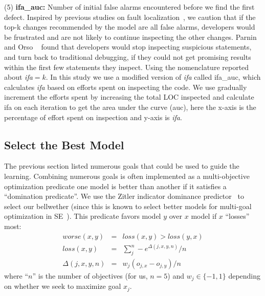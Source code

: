 \documentclass[10pt,journal,compsoc]{IEEEtran}
\begin{document}
{(5) \textbf{ifa\_auc:} Number of  initial false alarms encountered before we find the first defect. Inspired by previous studies on fault localization~\cite{parnin2011automated, kochhar2016practitioners, xia2016automated}, we caution that if the top-k changes recommended by the model are all false alarms, developers would be frustrated and are not likely to continue inspecting the other changes. Parnin and Orso ~\cite{parnin2011automated} found that developers would stop inspecting suspicious statements, and turn back to traditional debugging, if they could not get promising results within the first few statements they inspect. Using the nomenclature reported about {\em ifa$=k$}.  In this study we use a modified version of {\em ifa} called ifa\_auc, which calculates {\em ifa} based on efforts spent on inspecting the code. We use gradually increment the efforts spent by increasing the total LOC inspected and calculate ifa on each iteration to get the area under the curve (auc), here the x-axis is the percentage of effort spent on inspection and y-axis is {\em ifa}.}


\subsection{Select the Best Model}\label{sec:best}

The previous section listed numerous goals that could be used to guide the learning. Combining
numerous goals is often implemented as a multi-objective optimization predicate  one model is better than another if it
 satisfies a ``domination predicate''.
 We use the Zitler indicator dominance
 predictor~\cite{zit02} to select our bellwether (since this is known to select better models
 for multi-goal optimization in SE~\cite{Sayyad:2013,Sayyad:2013:SPL}).
This predicate favors model
  $y$ over $x$  model if $x$ ``losses'' most:
\begin{equation}\label{eq:cdom}
\begin{array}{rcl}
\textit{worse}(x,y)& =& \textit{loss}(x,y) > \textit{loss}(y,x)\\
\textit{loss}(x,y)& = &\sum_j^n -e^{\Delta(j,x,y,n)}/n\\
\Delta(j,x,y,n) & = & w_j(o_{j,x}  - o_{j,y})/n
\end{array}
\end{equation}
where  ``$n$'' is the number of objectives (for us, $n=5$) and $w_j\in \{-1,1\}$ depending on whether
we seek to maximize goal $x_j$.  
\end{document}
